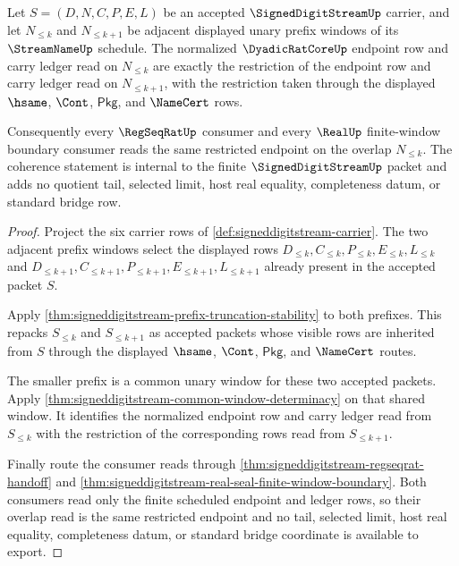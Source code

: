 \begin{theorem}
\label{thm:signeddigitstream-adjacent-window-endpoint-coherence}
Let $S=(D,N,C,P,E,L)$ be an accepted $\SignedDigitStreamUp$ carrier, and let
$N_{\leq k}$ and $N_{\leq k+1}$ be adjacent displayed unary prefix windows of
its $\StreamNameUp$ schedule. The normalized $\DyadicRatCoreUp$ endpoint row
and carry ledger read on $N_{\leq k}$ are exactly the restriction of the
endpoint row and carry ledger read on $N_{\leq k+1}$, with the restriction
taken through the displayed $\hsame$, $\Cont$, $\mathsf{Pkg}$, and $\NameCert$
rows.

Consequently every $\RegSeqRatUp$ consumer and every $\RealUp$ finite-window
boundary consumer reads the same restricted endpoint on the overlap
$N_{\leq k}$. The coherence statement is internal to the finite
$\SignedDigitStreamUp$ packet and adds no quotient tail, selected limit, host
real equality, completeness datum, or standard bridge row.
\end{theorem}
\begin{proof}
Project the six carrier rows of \autoref{def:signeddigitstream-carrier}. The
two adjacent prefix windows select the displayed rows
$D_{\leq k},C_{\leq k},P_{\leq k},E_{\leq k},L_{\leq k}$ and
$D_{\leq k+1},C_{\leq k+1},P_{\leq k+1},E_{\leq k+1},L_{\leq k+1}$ already
present in the accepted packet $S$.

Apply \autoref{thm:signeddigitstream-prefix-truncation-stability} to both
prefixes. This repacks $S_{\leq k}$ and $S_{\leq k+1}$ as accepted packets
whose visible rows are inherited from $S$ through the displayed $\hsame$,
$\Cont$, $\mathsf{Pkg}$, and $\NameCert$ routes.

The smaller prefix is a common unary window for these two accepted packets.
Apply \autoref{thm:signeddigitstream-common-window-determinacy} on that shared
window. It identifies the normalized endpoint row and carry ledger read from
$S_{\leq k}$ with the restriction of the corresponding rows read from
$S_{\leq k+1}$.

Finally route the consumer reads through
\autoref{thm:signeddigitstream-regseqrat-handoff} and
\autoref{thm:signeddigitstream-real-seal-finite-window-boundary}. Both
consumers read only the finite scheduled endpoint and ledger rows, so their
overlap read is the same restricted endpoint and no tail, selected limit, host
real equality, completeness datum, or standard bridge coordinate is available
to export.
\end{proof}

